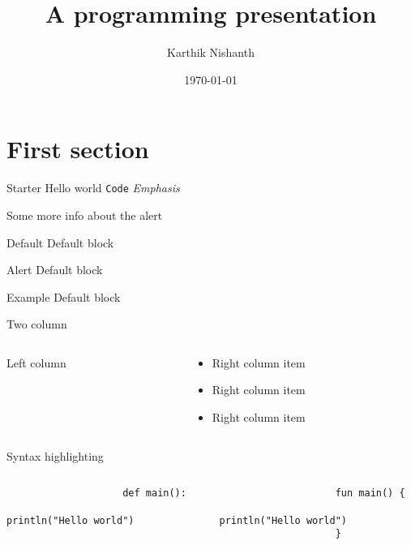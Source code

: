 \documentclass[169]{beamer}
\title{A programming presentation}
\date{\today}
\author{Karthik Nishanth}
\institute{Organization}
\begin{document}
    \maketitle

    \section{First section}\label{sec:first}
    \begin{frame}{Starter}
        Hello world \texttt{Code} \emph{Emphasis}

        Some more info about the \alert{alert} \\
        \begin{block}{Default}
            Default block
        \end{block}

        \begin{alertblock}{Alert}
            Default block
        \end{alertblock}
        \begin{exampleblock}{Example}
            Default block
        \end{exampleblock}
    \end{frame}

    \begin{frame}{Two column}
        \begin{columns}
            \begin{column}{0.5\textwidth}
                Left column
            \end{column}
            \begin{column}{0.5\textwidth}
                \begin{itemize}
                    \item Right column item
                    \item Right column item
                    \item Right column item
                \end{itemize}
            \end{column}
        \end{columns}
    \end{frame}

    \begin{frame}[fragile]{Syntax highlighting}
        \begin{columns}
            \begin{column}{0.5\textwidth}
                \begin{verbatim}
                    def main():
                        println("Hello world")
                \end{verbatim}
            \end{column}
            \begin{column}{0.5\textwidth}
                \begin{verbatim}
                    fun main() {
                        println("Hello world")
                    }
                \end{verbatim}
            \end{column}
        \end{columns}
    \end{frame}
\end{document}
